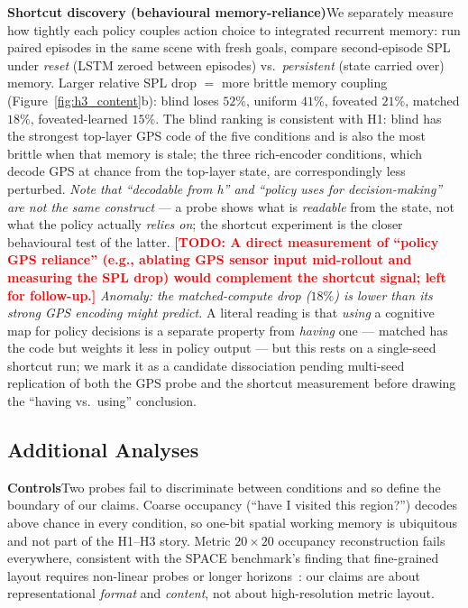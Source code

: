 \documentclass{article}
\newcommand{\TODO}[1]{\textcolor{red}{\textbf{[TODO: #1]}}}
\begin{document}
\noindent\textbf{Shortcut discovery (behavioural memory-reliance)}\quad We separately measure how tightly each policy couples action choice to integrated recurrent memory: run paired episodes in the same scene with fresh goals, compare second-episode SPL under \emph{reset} (LSTM zeroed between episodes) vs.\ \emph{persistent} (state carried over) memory. Larger relative SPL drop $=$ more brittle memory coupling (Figure~\ref{fig:h3_content}b): blind loses $52\%$, uniform $41\%$, foveated $21\%$, matched $18\%$, foveated-learned $15\%$. The blind ranking is consistent with H1: blind has the strongest top-layer GPS code of the five conditions and is also the most brittle when that memory is stale; the three rich-encoder conditions, which decode GPS at chance from the top-layer state, are correspondingly less perturbed. \emph{Note that ``decodable from h'' and ``policy uses for decision-making'' are not the same construct} --- a probe shows what is \emph{readable} from the state, not what the policy actually \emph{relies on}; the shortcut experiment is the closer behavioural test of the latter. \TODO{A direct measurement of ``policy GPS reliance'' (e.g., ablating GPS sensor input mid-rollout and measuring the SPL drop) would complement the shortcut signal; left for follow-up.} \emph{Anomaly: the matched-compute drop ($18\%$) is lower than its strong GPS encoding might predict.} A literal reading is that \emph{using} a cognitive map for policy decisions is a separate property from \emph{having} one --- matched has the code but weights it less in policy output --- but this rests on a single-seed shortcut run; we mark it as a candidate dissociation pending multi-seed replication of both the GPS probe and the shortcut measurement before drawing the ``having vs.\ using'' conclusion.


\subsection{Additional Analyses}
\label{sec:addl}

\noindent\textbf{Controls}\quad Two probes fail to discriminate between conditions and so define the boundary of our claims. Coarse occupancy (``have I visited this region?'') decodes above chance in every condition, so one-bit spatial working memory is ubiquitous and not part of the H1--H3 story. Metric $20{\times}20$ occupancy reconstruction fails everywhere, consistent with the SPACE benchmark's finding that fine-grained layout requires non-linear probes or longer horizons~\citep{ramakrishnan2025space}: our claims are about representational \emph{format} and \emph{content}, not about high-resolution metric layout.
\end{document}
